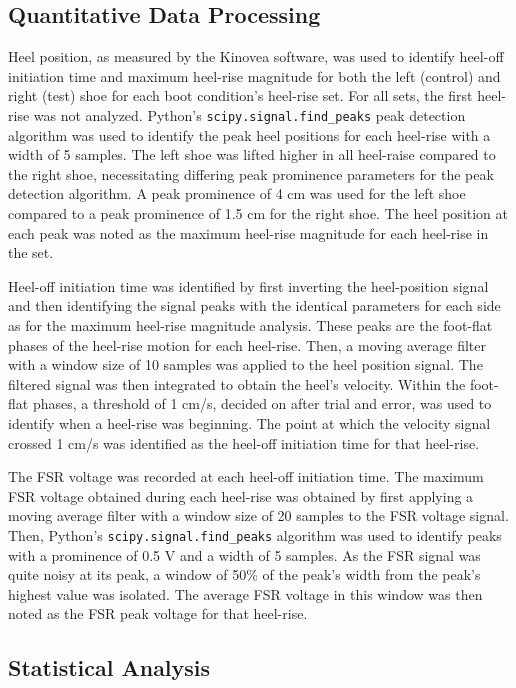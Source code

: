 \documentclass[defaultstyle,11pt]{thesis}
\begin{document}
\hypertarget{quantitative-data-processing}{%
\subsection{Quantitative Data Processing}\label{quantitative-data-processing}}

Heel position, as measured by the Kinovea software, was used to identify heel-off initiation time and maximum heel-rise magnitude for both the left (control) and right (test) shoe for each boot condition's heel-rise set.
For all sets, the first heel-rise was not analyzed.
Python's \texttt{scipy.signal.find\_peaks} peak detection algorithm was used to identify the peak heel positions for each heel-rise with a width of 5 samples.
The left shoe was lifted higher in all heel-raise compared to the right shoe, necessitating differing peak prominence parameters for the peak detection algorithm.
A peak prominence of 4 cm was used for the left shoe compared to a peak prominence of 1.5 cm for the right shoe.
The heel position at each peak was noted as the maximum heel-rise magnitude for each heel-rise in the set.

Heel-off initiation time was identified by first inverting the heel-position signal and then identifying the signal peaks with the identical parameters for each side as for the maximum heel-rise magnitude analysis.
These peaks are the foot-flat phases of the heel-rise motion for each heel-rise.
Then, a moving average filter with a window size of 10 samples was applied to the heel position signal.
The filtered signal was then integrated to obtain the heel's velocity.
Within the foot-flat phases, a threshold of 1 cm/s, decided on after trial and error, was used to identify when a heel-rise was beginning.
The point at which the velocity signal crossed 1 cm/s was identified as the heel-off initiation time for that heel-rise.

The FSR voltage was recorded at each heel-off initiation time.
The maximum FSR voltage obtained during each heel-rise was obtained by first applying a moving average filter with a window size of 20 samples to the FSR voltage signal.
Then, Python's \texttt{scipy.signal.find\_peaks} algorithm was used to identify peaks with a prominence of 0.5 V and a width of 5 samples.
As the FSR signal was quite noisy at its peak, a window of 50\% of the peak's width from the peak's highest value was isolated.
The average FSR voltage in this window was then noted as the FSR peak voltage for that heel-rise.

\hypertarget{statistical-analysis}{%
\subsection{Statistical Analysis}\label{statistical-analysis}}
\end{document}

